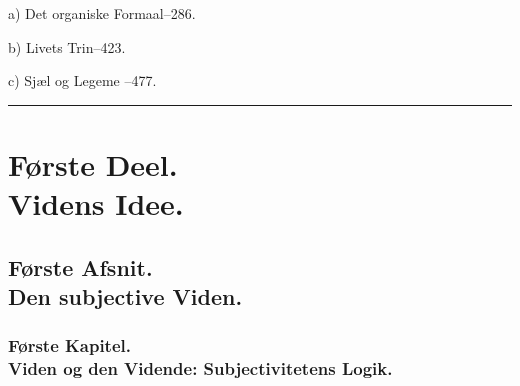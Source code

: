 \documentclass[11pt]{book}
\begin{document}
{a) Det organiske Formaal--286.\par\smallskip
b) Livets Trin--423.\par\smallskip
c) Sjæl og Legeme --477.\par\medskip
%
}

\medskip
\begin{center}\rule{0.14\textwidth}{1.2pt}\end{center}
\mainmatter\pagestyle{fancy}


\part*{Første Deel.\\ Videns Idee.}

\chapter*{Første Afsnit.\\ Den subjective Viden.}

\section*{Første Kapitel.\\ Viden og den Vidende: Subjectivitetens Logik.}
\end{document}
